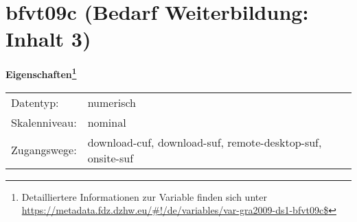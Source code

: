 
    \setcounter{footnote}{0}

    \vspace*{-1.8cm}
	\section{bfvt09c (Bedarf Weiterbildung: Inhalt 3)}
	\label{section:bfvt09c}



    \vspace*{0.5cm}
    \noindent\textbf{Eigenschaften\footnote{Detailliertere Informationen zur Variable finden sich unter
		\url{https://metadata.fdz.dzhw.eu/\#!/de/variables/var-gra2009-ds1-bfvt09c$}}}\\
	\begin{tabularx}{\hsize}{@{}lX}
	Datentyp: & numerisch \\
	Skalenniveau: & nominal \\
	Zugangswege: &
	  download-cuf, 
	  download-suf, 
	  remote-desktop-suf, 
	  onsite-suf
 \\
    \end{tabularx}



